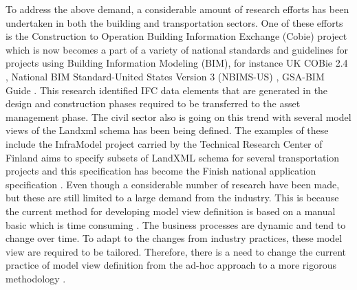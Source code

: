 \documentclass[Journal, InsideFigs, DoubleSpace]{ascelike} %
\begin{document}
To address the above demand, a considerable amount of research efforts has been undertaken in both the building and transportation sectors. One of these efforts is the Construction to Operation Building Information Exchange (Cobie) project \cite{east07} which is now becomes a part of a variety of national standards and guidelines for projects using Building Information Modeling (BIM), for instance UK COBie 2.4 \cite{nisbet12}, National BIM Standard-United States Version 3 (NBIMS-US) \cite{nibs15}, GSA-BIM Guide \cite{gsa11}. This research identified IFC data elements that are generated in the design and construction phases required to be transferred to the asset management phase. The civil sector also is going on this trend with several model views of the Landxml schema has been being defined. The examples of these include the InfraModel project carried by the Technical Research Center of Finland aims to specify subsets of LandXML schema for several transportation projects and this specification has become the Finish national application specification \cite{vtt16}. Even though a considerable number of research have been made, but these are still limited to a large demand from the industry. This is because the current method for developing model view definition is based on a manual basic which is time consuming \cite{venugopal12,eastman12,hu14}. The business processes are dynamic and tend to change over time. To adapt to the changes from industry practices, these model view are required to be tailored. Therefore, there is a need to change the current practice of model view definition from the ad-hoc approach to a more rigorous methodology \cite{venugopal12}. 
\par
\end{document}
